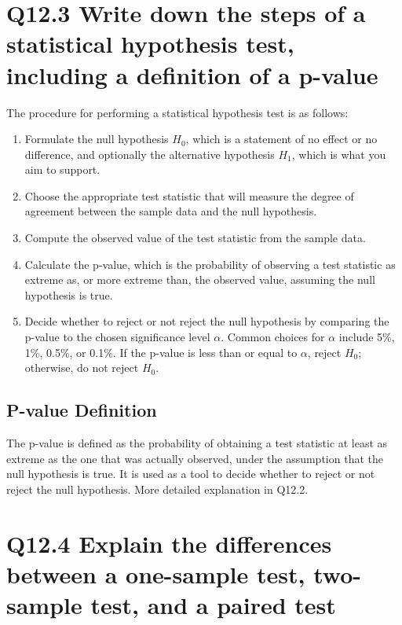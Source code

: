 \documentclass[11pt]{article}
\begin{document}
\section{Q12.3 Write down the steps of a statistical hypothesis test, including a definition of a p-value}

The procedure for performing a statistical hypothesis test is as follows:

\begin{enumerate}
    \item Formulate the null hypothesis \(H_0\), which is a statement of no effect or no difference, and optionally the alternative hypothesis \(H_1\), which is what you aim to support.
    \item Choose the appropriate test statistic that will measure the degree of agreement between the sample data and the null hypothesis.
    \item Compute the observed value of the test statistic from the sample data.
    \item Calculate the p-value, which is the probability of observing a test statistic as extreme as, or more extreme than, the observed value, assuming the null hypothesis is true.
    \item Decide whether to reject or not reject the null hypothesis by comparing the p-value to the chosen significance level \(\alpha\). Common choices for \(\alpha\) include 5\%, 1\%, 0.5\%, or 0.1\%. If the p-value is less than or equal to \(\alpha\), reject \(H_0\); otherwise, do not reject \(H_0\).
\end{enumerate}

\subsection*{P-value Definition}
The p-value is defined as the probability of obtaining a test statistic at least as extreme as the one that was actually observed, under the assumption that the null hypothesis is true. It is used as a tool to decide whether to reject or not reject the null hypothesis. More detailed explanation in Q12.2.

\section{Q12.4 Explain the differences between a one-sample test, two-sample test, and a paired test}
\end{document}
